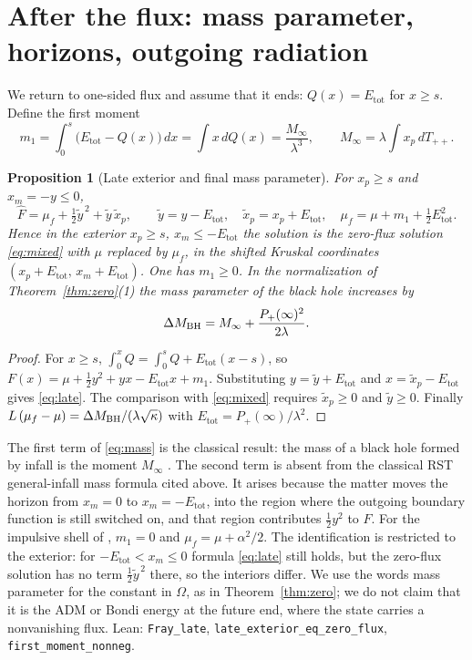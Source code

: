 \documentclass[11pt]{article}
\newtheorem{proposition}{Proposition}
\theoremstyle{remark}
\newcommand{\Etot}{E_{\mathrm{tot}}}
\newcommand{\Fh}{\widehat F}
\newcommand{\lean}[1]{\texttt{#1}}
\begin{document}
\section{After the flux: mass parameter, horizons, outgoing radiation}\label{sec:final}

We return to one-sided flux and assume that it ends: $Q(x)=\Etot$ for $x\ge s$. Define the first moment
\[
m_1=\int_0^{s}\bigl(\Etot-Q(x)\bigr)\,dx=\int x\,dQ(x)=\frac{M_\infty}{\lambda^3},\qquad M_\infty=\lambda\int x_p\,dT_{++}.
\]

\begin{proposition}[Late exterior and final mass parameter]\label{prop:late}
For $x_p\ge s$ and $x_m=-y\le0$,
\begin{equation}\label{eq:late}
\Fh=\mu_f+\tfrac12\tilde y^{\,2}+\tilde y\,\tilde x_p,\qquad \tilde y=y-\Etot,\quad \tilde x_p=x_p+\Etot,\quad \mu_f=\mu+m_1+\tfrac12\Etot^2 .
\end{equation}
Hence in the exterior $x_p\ge s$, $x_m\le-\Etot$ the solution is the zero-flux solution \eqref{eq:mixed} with $\mu$ replaced by $\mu_f$, in the shifted Kruskal coordinates $(x_p+\Etot,\,x_m+\Etot)$. One has $m_1\ge0$. In the normalization of Theorem~\ref{thm:zero}(1) the mass parameter of the black hole increases by
\begin{equation}\label{eq:mass}
\Delta M_{\rm BH}=M_\infty+\frac{P_+(\infty)^2}{2\lambda}.
\end{equation}
\end{proposition}
\begin{proof}
For $x\ge s$, $\int_0^xQ=\int_0^sQ+\Etot(x-s)$, so $F(x)=\mu+\tfrac12y^2+yx-\Etot x+m_1$. Substituting $y=\tilde y+\Etot$ and $x=\tilde x_p-\Etot$ gives \eqref{eq:late}. The comparison with \eqref{eq:mixed} requires $\tilde x_p\ge0$ and $\tilde y\ge0$. Finally $L\,(\mu_f-\mu)=\Delta M_{\rm BH}/(\lambda\sqrt\kappa)$ with $\Etot=P_+(\infty)/\lambda^2$.
\end{proof}

The first term of \eqref{eq:mass} is the classical result: the mass of a black hole formed by infall is the moment $M_\infty$ \cite{RST,Thorlacius}. The second term is absent from the classical RST general-infall mass formula cited above. It arises because the matter moves the horizon from $x_m=0$ to $x_m=-\Etot$, into the region where the outgoing boundary function is still switched on, and that region contributes $\tfrac12y^2$ to $\Fh$. For the impulsive shell of \cite{KimSon}, $m_1=0$ and $\mu_f=\mu+\alpha^2/2$. The identification is restricted to the exterior: for $-\Etot<x_m\le0$ formula \eqref{eq:late} still holds, but the zero-flux solution has no term $\tfrac12\tilde y^{\,2}$ there, so the interiors differ. We use the words mass parameter for the constant in $\Omega$, as in Theorem~\ref{thm:zero}; we do not claim that it is the ADM or Bondi energy at the future end, where the state carries a nonvanishing flux. Lean: \lean{Fray\_late}, \lean{late\_exterior\_eq\_zero\_flux}, \lean{first\_moment\_nonneg}.
\end{document}
